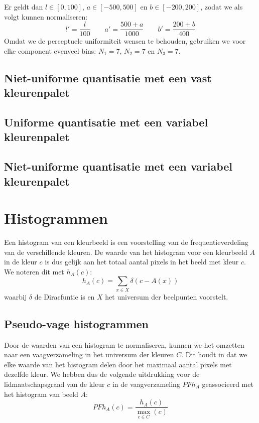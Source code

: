Er geldt dan $l \in [0,100]$, $a \in [-500,500]$ en $b \in [-200,200]$,
zodat we als volgt kunnen normaliseren:
$$
l' = \frac{l}{100} \qquad
a' = \frac{500 + a}{1000} \qquad
b' = \frac{200 + b}{400}
$$
Omdat we de perceptuele uniformiteit wensen te behouden, gebruiken we voor elke component evenveel bins: 
$N_1=7$, $N_2=7$ en $N_3=7$.

\subsection{Niet-uniforme quantisatie met een vast kleurenpalet}

\subsection{Uniforme quantisatie met een variabel kleurenpalet}

\subsection{Niet-uniforme quantisatie met een variabel kleurenpalet} 



\section{Histogrammen}

Een histogram van een kleurbeeld is een voorstelling van de frequentieverdeling van de
verschillende kleuren. De waarde van het histogram voor een kleurbeeld $A$ in de kleur $c$ is
dus gelijk aan het totaal aantal pixels in het beeld met kleur $c$. We noteren dit met $h_A(c)$:
$$
h_A(c) = \sum_{x \in X} \delta (c - A(x))
$$
waarbij $\delta$ de Diracfuntie is en $X$ het universum der beelpunten voorstelt. 


\subsection{Pseudo-vage histogrammen}

Door de waarden van een histogram te normaliseren, kunnen we het omzetten naar een 
vaagverzameling in het universum der kleuren $C$. Dit houdt in dat we elke
waarde van het histogram delen door het maximaal aantal pixels met dezelfde kleur. 
We hebben dus de volgende uitdrukking voor de lidmaatschapsgraad van de kleur $c$ in de 
vaagverzameling $\mathit{PFh}_A$ geassocieerd met het histogram van beeld $A$:
$$
\mathit{PFh}_A(c) = \frac{\displaystyle h_A(c)}{\displaystyle \max_{c \in C}(c)}
$$


